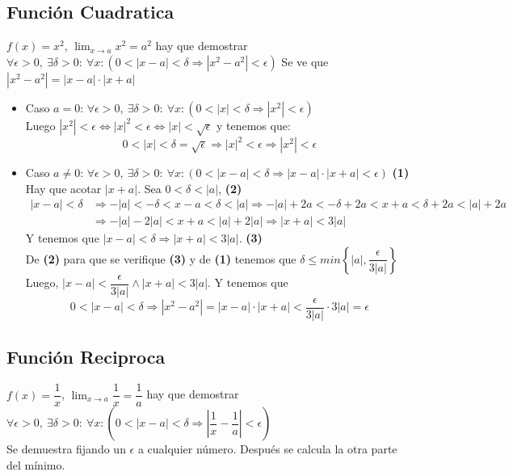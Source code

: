 \documentclass[11pt,a4paper]{article}
\begin{document}
\subsection{Funci\'on Cuadratica}
$f(x)=x^2$, $\displaystyle{\lim_{x\to a}x^2=a^2}$ hay que demostrar $\forall\epsilon>0,\ \exists\delta>0:\ \forall x: (0<|x-a|<\delta \Rightarrow |x^2-a^2|<\epsilon)$
Se ve que $|x^2-a^2| = |x-a|\cdot|x+a|$
\begin{itemize}
\item Caso $a=0$: $\forall\epsilon>0,\ \exists\delta>0:\ \forall x: (0<|x|<\delta \Rightarrow |x^2|<\epsilon)$\\
Luego $|x^2|<\epsilon \iff |x|^2<\epsilon \iff |x|<\sqrt{\epsilon}$ y tenemos que: $$0<|x|<\delta=\sqrt{\epsilon} \Rightarrow |x|^2<\epsilon \Rightarrow |x^2|<\epsilon$$
\item Caso $a\not = 0$: $\forall\epsilon>0,\ \exists\delta>0:\ \forall x: (0<|x-a|<\delta \Rightarrow |x-a|\cdot|x+a|<\epsilon)$ \hfill \textbf{(1)}\\
Hay que acotar $|x+a|$. Sea $0<\delta<|a|$, \hfill \textbf{(2)}
\begin{align*}
|x-a|<\delta &\Rightarrow -|a|<-\delta<x-a<\delta<|a| \Rightarrow -|a|+2a<-\delta+2a < x+a < \delta+2a < |a|+2a\\
& \Rightarrow -|a|-2|a| < x+a < |a|+2|a| \Rightarrow |x+a| < 3|a|
\end{align*}
Y tenemos que $|x-a|<\delta \Rightarrow |x+a| < 3|a|$. \hfill \textbf{(3)}\\
De \textbf{(2)} para que se verifique \textbf{(3)} y de \textbf{(1)} tenemos que $\delta\leq min\left\{|a|, \dfrac{\epsilon}{3|a|}\right\}$\\
Luego, $|x-a|<\dfrac{\epsilon}{3|a|} \land |x+a|<3|a|$. Y tenemos que $$0<|x-a|<\delta \Rightarrow |x^2-a^2| = |x-a|\cdot|x+a| < \dfrac{\epsilon}{3|a|}\cdot 3|a| = \epsilon$$
\end{itemize}

\subsection{Funci\'on Reciproca}
$f(x)=\dfrac{1}{x}$, $\displaystyle{\lim_{x\to a}\dfrac{1}{x}=\dfrac{1}{a}}$ hay que demostrar $\forall\epsilon>0,\ \exists\delta>0:\ \forall x: (0<|x-a|<\delta \Rightarrow |\dfrac{1}{x}-\dfrac{1}{a}|<\epsilon)$\\

\noindent Se demuestra fijando un $\epsilon$ a cualquier n\'umero. Despu\'es se calcula la otra parte del m\'inimo.
\end{document}
